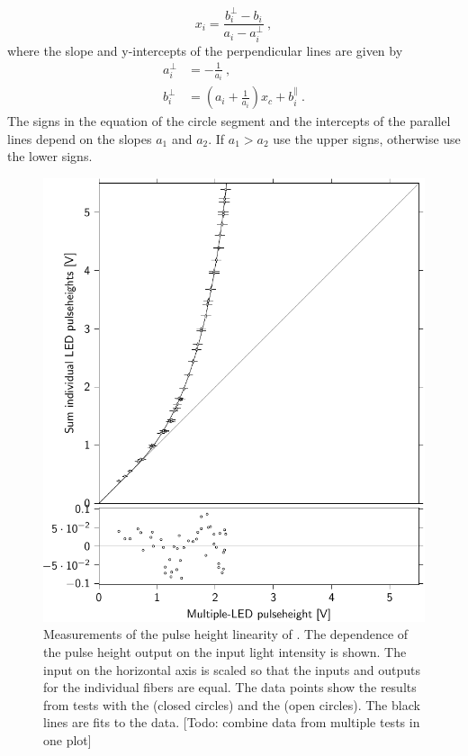 %
\begin{equation}
    x_i = \frac{b^{\bot}_i - b_i}{a_i - a^{\bot}_i} \ ,
\end{equation}
%
where the slope and y-intercepts of the perpendicular lines are given by
%
\begin{equation}
    \begin{aligned}
    a^{\bot}_i &= -\frac{1}{a_i} \ ,\\
    b^{\bot}_i &= \left(a_i + \frac{1}{a_i}\right) x_c + b^{\parallel}_i \ .
    \end{aligned}
\end{equation}
%
The signs in the equation of the circle segment and the intercepts of the parallel lines depend on the slopes $a_1$ and $a_2$. If $a_1 > a_2$ use the upper signs, otherwise use the lower signs.

\begin{figure}
    \centering
    \includegraphics[width=0.7\linewidth]{plots/station/data_ph_senstech}
    \caption{Measurements of the pulse height linearity of \pmts. The dependence of the pulse height output on the input light intensity is shown. The input on the horizontal axis is scaled so that the inputs and outputs for the individual fibers are equal. The data points show the results from tests with the \senstech \pmt (closed circles) and the \nikhef \pmt (open circles). The black lines are fits to the data. [Todo: combine data from multiple tests in one plot]}
    \label{fig:linearity_pmts}
\end{figure}

